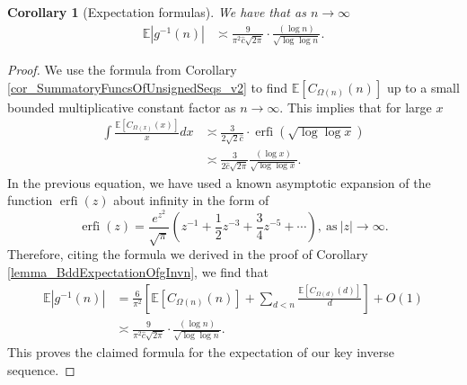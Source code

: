 \documentclass[11pt,reqno,a4letter]{article}
\numberwithin{figure}{section}
\numberwithin{table}{section}
\theoremstyle{plain}
\newtheorem{cor}[theorem]{Corollary}
\numberwithin{theorem}{section}
\theoremstyle{definition}
\begin{document}
\begin{cor}[Expectation formulas] 
\label{cor_ExpectationFormulaAbsgInvn_v2} 
We have that as $n \rightarrow \infty$ 
\begin{align*} 
\mathbb{E}|g^{-1}(n)| & \asymp \frac{9}{\pi^2 \hat{c} \sqrt{2\pi}} \cdot \frac{(\log n)}{\sqrt{\log\log n}}. 
\end{align*} 
\end{cor} 
\begin{proof} 
We use the formula from Corollary \ref{cor_SummatoryFuncsOfUnsignedSeqs_v2} 
to find $\mathbb{E}[C_{\Omega(n)}(n)]$ up to a small bounded multiplicative 
constant factor as $n \rightarrow \infty$.
This implies that for large $x$ 
\begin{align*} 
\int \frac{\mathbb{E}[C_{\Omega(x)}(x)]}{x} dx & \asymp 
     \frac{3}{2\sqrt{2} \hat{c}} \cdot \operatorname{erfi}\left(\sqrt{\log\log x}\right) \\ 
     & \asymp \frac{3}{2\hat{c} \sqrt{2\pi}} \frac{(\log x)}{\sqrt{\log\log x}}. 
\end{align*} 
In the previous equation, we have used a known asymptotic expansion of the function $\operatorname{erfi}(z)$ 
about infinity in the form of \cite[\S 3.2]{INCGAMMA-BOOK} 
\[
\operatorname{erfi}(z) = \frac{e^{z^2}}{\sqrt{\pi}} \left(z^{-1} + \frac{1}{2}z^{-3} + \frac{3}{4}z^{-5} + \cdots \right), 
     \mathrm{\ as\ } |z| \rightarrow \infty. 
\]
Therefore, citing the formula we derived in the proof of 
Corollary \ref{lemma_BddExpectationOfgInvn}, we find that 
\begin{align*} 
\mathbb{E}|g^{-1}(n)| & = \frac{6}{\pi^2}\left[\mathbb{E}[C_{\Omega(n)}(n)] + 
     \sum_{d<n} \frac{\mathbb{E}[C_{\Omega(d)}(d)]}{d}\right] + O(1) \\ 
     & \asymp \frac{9}{\pi^2 \hat{c} \sqrt{2\pi}} \cdot \frac{(\log n)}{\sqrt{\log\log n}}. 
\end{align*} 
This proves the claimed formula for the expectation of our key inverse sequence. 
\end{proof} 
\end{document}
